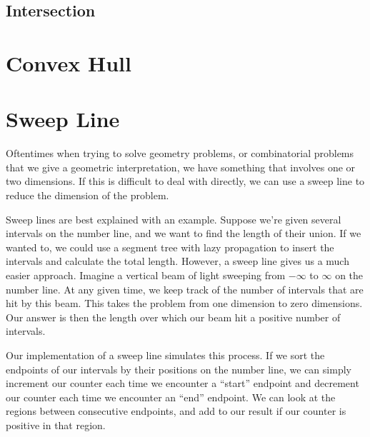 \subsection{Intersection}

\section{Convex Hull}

\section{Sweep Line}

Oftentimes when trying to solve geometry problems, or combinatorial problems that we give a geometric interpretation, we have something that involves one or two dimensions. If this is difficult to deal with directly, we can use a sweep line to reduce the dimension of the problem.

Sweep lines are best explained with an example. Suppose we're given several intervals on the number line, and we want to find the length of their union. If we wanted to, we could use a segment tree with lazy propagation to insert the intervals and calculate the total length. However, a sweep line gives us a much easier approach. Imagine a vertical beam of light sweeping from $-\infty$ to $\infty$ on the number line. At any given time, we keep track of the number of intervals that are hit by this beam. This takes the problem from one dimension to zero dimensions. Our answer is then the length over which our beam hit a positive number of intervals.

Our implementation of a sweep line simulates this process. If we sort the endpoints of our intervals by their positions on the number line, we can simply increment our counter each time we encounter a ``start'' endpoint and decrement our counter each time we encounter an ``end'' endpoint. We can look at the regions between consecutive endpoints, and add to our result if our counter is positive in that region.

\begin{center}\end{center}

